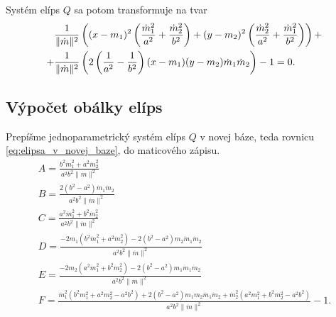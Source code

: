 Systém elíps $Q$ sa potom transformuje na tvar
\begin{align} 
\label{eq:elipsa_v_novej_baze}
&\frac{1}{\|{\dot{m}}\|^2} \left( (x - m_1)^2 \left( \frac{{\dot{m}_1}^2}{a^2} + \frac{{\dot{m}_2}^2}{b^2} \right) + (y - m_2)^2 \left( \frac{{\dot{m}_2}^2}{a^2} + \frac{{\dot{m}_1}^2}{b^2} \right) \right) \notag + \\
+ &\frac{1}{\|{\dot{m}}\|^2} \left( 2\left( \frac{1}{a^2} - \frac{1}{b^2} \right)(x - m_1)(y - m_2)\dot{m}_1\dot{m}_2 \right) - 1 = 0.
\end{align}

\subsection{Výpočet obálky elíps}
Prepíšme jednoparametrický systém elíps $Q$ v novej báze, teda rovnicu \ref{eq:elipsa_v_novej_baze}, do maticového zápisu.
\begin{gather*}
A = \frac{b^2 \dot{m}_1^2 + a^2 \dot{m}_2^2}{a^2b^2 \| \dot{m} \|^2} \\
B = \frac{2(b^2-a^2)\dot{m}_1 \dot{m}_2}{a^2b^2 \| \dot{m} \|^2} \\
C = \frac{a^2 \dot{m}_1^2 + b^2 \dot{m}_2^2}{a^2b^2\| \dot{m} \|^2} \\
D = \frac{- 2m_1 \left( b^2 \dot{m}_1^2 + a^2 \dot{m}_2^2 \right) - 2 \left(b^2 - a^2 \right) m_2 \dot{m}_1 \dot{m}_2 }{a^2b^2\| \dot{m} \|^2} \\
E = \frac{- 2m_2 \left( a^2 \dot{m}_1^2 + b^2 \dot{m}_2^2 \right) - 2 \left(b^2 - a^2 \right) m_1 \dot{m}_1 \dot{m}_2 }{a^2b^2\| \dot{m} \|^2} \\
F = \frac{\dot{m}_1^2 (b^2 m_1^2 + a^2 m_2^2 - a^2b^2) + 2 (b^2 - a^2) m_1 m_2 \dot{m}_1 \dot{m}_2 + \dot{m}_2^2 (a^2 m_1^2 + b^2 m_2^2 - a^2b^2) }{a^2b^2\| \dot{m}  \|^2}  -  1.  \\
\end{gather*}

